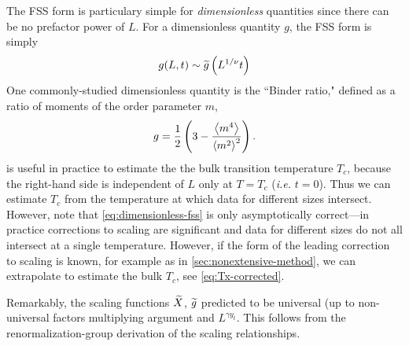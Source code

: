 The FSS form is particulary simple for \emph{dimensionless} quantities since
there can be no prefactor power of $L$. For a dimensionless quantity $g$, the
FSS form is simply
\begin{equation}
  g(L,t) \sim \widetilde{g}\left(L^{1/\nu} t\right)
  \label{eq:dimensionless-fss}
\end{equation}
One commonly-studied dimensionless quantity is the ``Binder ratio,"
defined as a ratio of moments of the order parameter $m$,
\begin{equation}
  g = \frac{1}{2}\left(3 - \frac{\left< m^4 \right>}{\left< m^2 \right>^2}\right).
  \label{eq:def-binder}
\end{equation}
 is useful in practice to estimate the the bulk
transition temperature $T_c$, because the right-hand side is independent of $L$
only at $T=T_c$ (\emph{i.e.} $t=0$). Thus we can estimate $T_c$ from the
temperature at which data for different sizes intersect. However, note that
\cref{eq:dimensionless-fss} is only asymptotically correct---in practice
corrections to scaling are significant and data for different sizes do not all
intersect at a single temperature. However, if the form of the leading
correction to scaling is known, for example as in
\cref{sec:nonextensive-method}, we can extrapolate to estimate the bulk $T_c$,
see \cref{eq:Tx-corrected}.

Remarkably, the scaling functions $\widetilde{X}$, $\widetilde{g}$ predicted to
be universal (up to non-universal factors multiplying argument and $L^{\gamma
  y_t}$. This follows from the renormalization-group derivation of the scaling
relationships.

%
%


